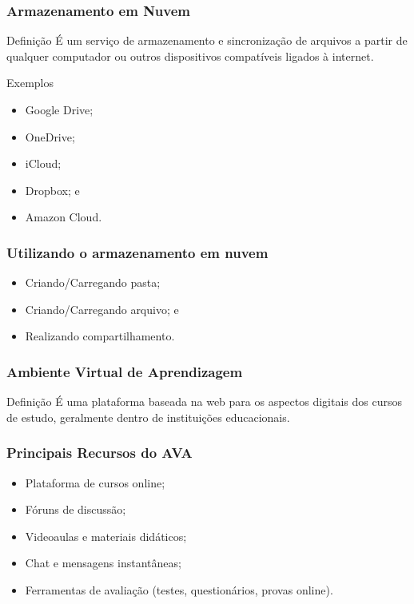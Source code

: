 \documentclass[aspectratio=169]{beamer} %
\begin{document}
\begin{frame}
	\frametitle{Armazenamento em Nuvem}
	
	\begin{block}{Defini\c cão}
		É um serviço de armazenamento e sincronização de arquivos a partir de qualquer computador ou outros dispositivos compatíveis ligados à internet.
	\end{block} \vfill
	
	\begin{exampleblock}{Exemplos}
		\begin{itemize}
			\item Google Drive;
			\item OneDrive;
			\item iCloud; 
			\item Dropbox; e
			\item Amazon Cloud.
		\end{itemize}
	\end{exampleblock}
\end{frame}

\begin{frame}
	\frametitle{Utilizando o armazenamento em nuvem}
	
	\begin{itemize}
		\item Criando/Carregando pasta;
		\item Criando/Carregando arquivo; e
		\item Realizando compartilhamento.
	\end{itemize}
\end{frame}

\begin{frame}
	\frametitle{Ambiente Virtual de Aprendizagem}
	
	\begin{block}{Definição}
		 É uma plataforma baseada na web para os aspectos digitais dos cursos de estudo, geralmente dentro de instituições educacionais.
	\end{block}
\end{frame}

\begin{frame}
	\frametitle{Principais Recursos do AVA}
	
	\begin{itemize}
		\item Plataforma de cursos online;
		\item Fóruns de discussão;
		\item Videoaulas e materiais didáticos;
		\item Chat e mensagens instantâneas;
		\item Ferramentas de avaliação (testes, questionários, provas online).
	\end{itemize}
\end{frame}
\end{document}
